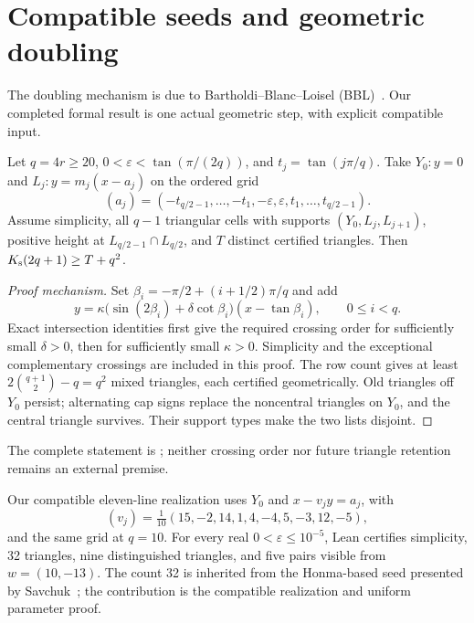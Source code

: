 \section{Compatible seeds and geometric doubling}
\label{jfam:section}

The doubling mechanism is due to Bartholdi--Blanc--Loisel
(BBL)~\cite{bbl2008}.  Our completed formal result is one actual geometric
step, with explicit compatible input.

\begin{theorem}
\label{jfam:doubling}
Let $q=4r\ge20$, $0<\varepsilon<\tan(\pi/(2q))$, and $t_j=\tan(j\pi/q)$.
Take $Y_0:y=0$ and $L_j:y=m_j(x-a_j)$ on the ordered grid
\[
 (a_j)=(-t_{q/2-1},\ldots,-t_1,-\varepsilon,
              \varepsilon,t_1,\ldots,t_{q/2-1}).
\]
Assume simplicity, all $q-1$ triangular cells with supports
$(Y_0,L_j,L_{j+1})$, positive height at
$L_{q/2-1}\cap L_{q/2}$, and $T$ distinct
certified triangles.  Then $K_{\mathrm s}(2q+1)\ge T+q^2$.
\end{theorem}
\begin{proof}[Proof mechanism]
Set $\beta_i=-\pi/2+(i+1/2)\pi/q$ and add
\[
 y=\kappa\bigl(\sin(2\beta_i)+\delta\cot\beta_i\bigr)
                  (x-\tan\beta_i),\qquad 0\le i<q.
\]
Exact intersection identities first give the required crossing order
for sufficiently small $\delta>0$, then for sufficiently small
$\kappa>0$.  Simplicity and the exceptional complementary crossings
are included in this proof.  The row count gives at least
$2\binom{q+1}{2}-q=q^2$ mixed triangles, each certified geometrically.
Old triangles off $Y_0$ persist; alternating cap signs replace the
noncentral triangles on $Y_0$, and the central triangle survives.
Their support types make the two lists disjoint.
\end{proof}
The complete statement is ; neither crossing
order nor future triangle retention remains an external premise.

Our compatible eleven-line realization uses $Y_0$ and $x-v_jy=a_j$, with
\[
 (v_j)=\tfrac1{10}(15,-2,14,1,4,-4,5,-3,12,-5),
\]
and the same grid at $q=10$.  For every real
$0<\varepsilon\le10^{-5}$, Lean certifies simplicity, 32 triangles,
nine distinguished triangles, and five pairs visible from $w=(10,-13)$.
The count 32
is inherited from the Honma-based seed presented by
Savchuk~\cite{savchuk2025}; the contribution is the compatible realization
and uniform parameter proof.

